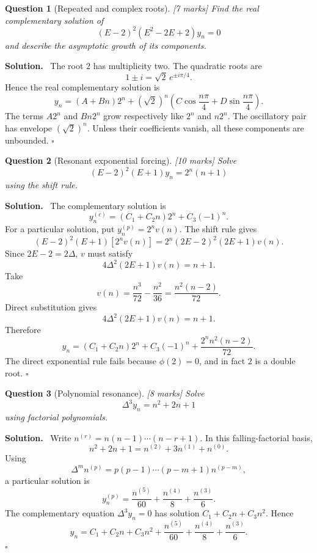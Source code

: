 \documentclass[11pt,a4paper]{article}
\theoremstyle{questionstyle}
\newtheorem{question}{Question}
\newenvironment{solution}
  {\par\noindent\textbf{\color{solutiongreen}Solution.}\ }
  {\hfill$\square$\par}
\newcommand{\pointmark}[1]{\hfill\textnormal{\textit{[#1 marks]}}}
\begin{document}
\begin{question}[Repeated and complex roots]\pointmark{7}
Find the real complementary solution of
\[
  (E-2)^2(E^2-2E+2)y_n=0
\]
and describe the asymptotic growth of its components.
\end{question}

\begin{solution}
The root \(2\) has multiplicity two.  The quadratic roots are
\[
  1\pm i=\sqrt2\,e^{\pm i\pi/4}.
\]
Hence the real complementary solution is
\[
  \boxed{
  y_n=(A+Bn)2^n
  +(\sqrt2)^n
   \left(C\cos\frac{n\pi}{4}
         +D\sin\frac{n\pi}{4}\right)}.
\]
The terms \(A2^n\) and \(Bn2^n\) grow respectively like \(2^n\) and
\(n2^n\).  The oscillatory pair has envelope \((\sqrt2)^n\).
Unless their coefficients vanish, all these components are unbounded.
\end{solution}

\begin{question}[Resonant exponential forcing]\pointmark{10}
Solve
\[
  (E-2)^2(E+1)y_n=2^n(n+1)
\]
using the shift rule.
\end{question}

\begin{solution}
The complementary solution is
\[
  y_n^{(c)}=(C_1+C_2n)2^n+C_3(-1)^n.
\]
For a particular solution, put \(y_n^{(p)}=2^nv(n)\).  The shift rule
gives
\[
  (E-2)^2(E+1)[2^nv(n)]
  =2^n(2E-2)^2(2E+1)v(n).
\]
Since \(2E-2=2\Delta\), \(v\) must satisfy
\[
  4\Delta^2(2E+1)v(n)=n+1.
\]
Take
\[
  v(n)=\frac{n^3}{72}-\frac{n^2}{36}
      =\frac{n^2(n-2)}{72}.
\]
Direct substitution gives
\[
  4\Delta^2(2E+1)v(n)=n+1.
\]
Therefore
\[
  \boxed{
  y_n=(C_1+C_2n)2^n+C_3(-1)^n
      +\frac{2^nn^2(n-2)}{72}}.
\]
The direct exponential rule fails because \(\phi(2)=0\), and in fact
\(2\) is a double root.
\end{solution}

\begin{question}[Polynomial resonance]\pointmark{8}
Solve
\[
  \Delta^3y_n=n^2+2n+1
\]
using factorial polynomials.
\end{question}

\begin{solution}
Write \(n^{(r)}=n(n-1)\cdots(n-r+1)\).  In this
falling-factorial basis,
\[
  n^2+2n+1=n^{(2)}+3n^{(1)}+n^{(0)}.
\]
Using
\[
  \Delta^m n^{(p)}
  =p(p-1)\cdots(p-m+1)n^{(p-m)},
\]
a particular solution is
\[
  y_n^{(p)}
  =\frac{n^{(5)}}{60}
   +\frac{n^{(4)}}8
   +\frac{n^{(3)}}6.
\]
The complementary equation \(\Delta^3y_n=0\) has solution
\(C_1+C_2n+C_3n^2\).  Hence
\[
  \boxed{
  y_n=C_1+C_2n+C_3n^2
  +\frac{n^{(5)}}{60}
  +\frac{n^{(4)}}8
  +\frac{n^{(3)}}6}.
\]
\end{solution}
\end{document}
